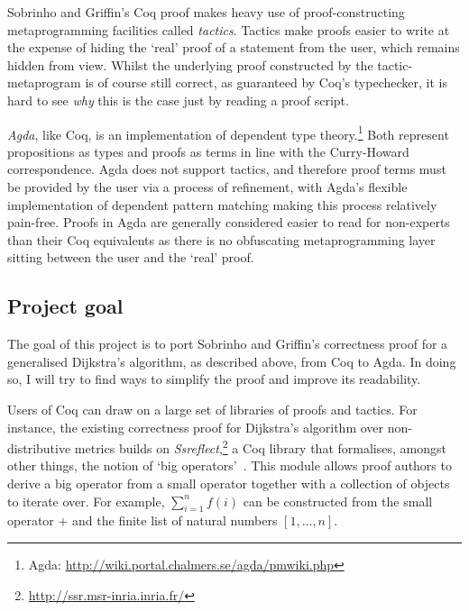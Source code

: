\documentclass[a4paper]{article}
\begin{document}
Sobrinho and Griffin's Coq proof makes heavy use of proof-constructing metaprogramming facilities called \emph{tactics}.
Tactics make proofs easier to write at the expense of hiding the `real' proof of a statement from the user, which remains hidden from view.
Whilst the underlying proof constructed by the tactic-metaprogram is of course still correct, as guaranteed by Coq's typechecker, it is hard to see \emph{why} this is the case just by reading a proof script.

\emph{Agda}, like Coq, is an implementation of dependent type theory.\footnote{Agda: \url{http://wiki.portal.chalmers.se/agda/pmwiki.php}} Both represent propositions as types and proofs as terms in line with the Curry-Howard correspondence.
Agda does not support tactics, and therefore proof terms must be provided by the user via a process of refinement, with Agda's flexible implementation of dependent pattern matching making this process relatively pain-free. Proofs in Agda are generally considered easier to read for non-experts than their Coq equivalents as there is no obfuscating metaprogramming layer sitting between the user and the `real' proof.

\subsection{Project goal}

The goal of this project is to port Sobrinho and Griffin's correctness proof for a generalised Dijkstra's algorithm, as described above, from Coq to Agda.
In doing so, I will try to find ways to simplify the proof and improve its readability.

Users of Coq can draw on a large set of libraries of proofs and tactics.
For instance, the existing correctness proof for Dijkstra's algorithm over non-distributive metrics builds on \emph{Ssreflect},\footnote{\url{http://ssr.msr-inria.inria.fr/}} a Coq library that formalises, amongst other things, the notion of `big operators'~\cite{bertot_canonical_2008}. This module allows proof authors to derive a big operator from a small operator together with a collection of objects to iterate over. For example, \(\sum_{i=1}^n f(i)\) can be constructed from the small operator \(+\) and the finite list of natural numbers \([1, \dots, n]\).
\end{document}
